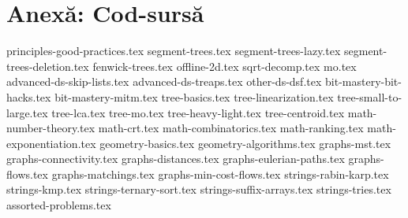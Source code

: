 \appendix
\renewcommand{\thechapter}{\arabic{chapter}}

\part{Anexă: Cod-sursă}

{principles-good-practices.tex}
{segment-trees.tex}
{segment-trees-lazy.tex}
{segment-trees-deletion.tex}
{fenwick-trees.tex}
{offline-2d.tex}
{sqrt-decomp.tex}
{mo.tex}
{advanced-ds-skip-lists.tex}
{advanced-ds-treaps.tex}
{other-ds-dsf.tex}
{bit-mastery-bit-hacks.tex}
{bit-mastery-mitm.tex}
{tree-basics.tex}
{tree-linearization.tex}
{tree-small-to-large.tex}
{tree-lca.tex}
{tree-mo.tex}
{tree-heavy-light.tex}
{tree-centroid.tex}
{math-number-theory.tex}
{math-crt.tex}
{math-combinatorics.tex}
{math-ranking.tex}
{math-exponentiation.tex}
{geometry-basics.tex}
{geometry-algorithms.tex}
{graphs-mst.tex}
{graphs-connectivity.tex}
{graphs-distances.tex}
{graphs-eulerian-paths.tex}
{graphs-flows.tex}
{graphs-matchings.tex}
{graphs-min-cost-flows.tex}
{strings-rabin-karp.tex}
{strings-kmp.tex}
{strings-ternary-sort.tex}
{strings-suffix-arrays.tex}
{strings-tries.tex}
{assorted-problems.tex}
